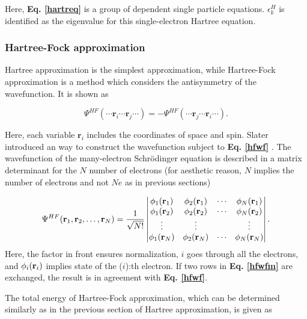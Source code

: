 \documentclass[a4paper, 12pt, titlepage,oneside,drop]{kthesis}
\begin{document}
Here, \textbf{Eq. \ref{hartreq}} is a group of dependent single particle equations. $\epsilon_k^{{H}}$ is identified as the eigenvalue for this single-electron Hartree equation.

\subsubsection{Hartree-Fock approximation}
Hartree approximation is the simplest approximation, while Hartree-Fock approximation is a method which considers the antisymmetry of the wavefunction. It is shown as

\begin{equation}\label{hfwf}
\Psi^{HF} ( \cdots \textbf{r}_{i} \cdots  \textbf{r}_{j} \cdots ) = - \Psi^{HF} ( \cdots \textbf{r}_{j} \cdots  \textbf{r}_{i} \cdots).
\end{equation}

Here, each variable ${\textbf{r}_{{i}}}$ includes the coordinates of space and spin. Slater introduced an way to construct the wavefunction subject to \textbf{Eq. \ref{hfwf}} \cite{slater1951simplification}. The wavefunction of the many-electron 
Schrödinger equation is described in a matrix determinant for the $N$ number of electrons (for aesthetic reason, $N$ implies the number of electrons and not $Ne$ as in previous sections)

\begin{equation}\label{hfwfm}
\Psi^{HF}(\textbf{r}_1, \textbf{r}_2, \ldots, \textbf{r}_N) =
\frac{1}{\sqrt{N!}} \left|
\begin{matrix}
    \bwff<1><1> & \bwff<2><1> & \cdots & \bwff<N><1> \\
    \bwff<1><2> & \bwff<2><2> & \cdots & \bwff<N><2> \\
    \vdots               & \vdots               &        & \vdots               \\
    \bwff<1><N> & \bwff<2><N> & \cdots & \bwff<N><N>
\end{matrix} \right|.
\end{equation}
\noindent Here, the factor in front ensures normalization, $i$ goes through all the electrons, and $\bwff<i><i>$ implies state of the ($i$):th electron. If two rows in \textbf{Eq. \ref{hfwfm}} are exchanged, the result is 
in agreement with \textbf{Eq. \ref{hfwf}}.

The total energy of Hartree-Fock approximation, which can be determined similarly as in the previous section of Hartree approximation, is given as
\end{document}
